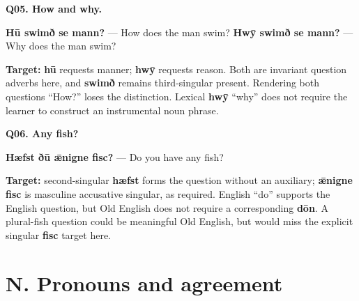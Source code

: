 \par\begin{minipage}{\linewidth}\raggedright
\textbf{Q05. How and why.}

\textbf{Hū swimð se mann?} — How does the man swim? \textbf{Hwȳ swimð se mann?} — Why does the man swim?

\textbf{Target:} \textbf{hū} requests manner; \textbf{hwȳ} requests reason. Both are invariant question adverbs here, and \textbf{swimð} remains third-singular present. Rendering both questions “How?” loses the distinction. Lexical \textbf{hwȳ} “why” does not require the learner to construct an instrumental noun phrase.

\end{minipage}\par\addvspace{4pt}

\par\begin{minipage}{\linewidth}\raggedright
\textbf{Q06. Any fish?}

\textbf{Hæfst ðū ǣnigne fisc?} — Do you have any fish?

\textbf{Target:} second-singular \textbf{hæfst} forms the question without an auxiliary; \textbf{ǣnigne fisc} is masculine accusative singular, as required. English “do” supports the English question, but Old English does not require a corresponding \textbf{dōn}. A plural-fish question could be meaningful Old English, but would miss the explicit singular \textbf{fisc} target here.

\end{minipage}\par\addvspace{4pt}

\section*{N. Pronouns and agreement}

